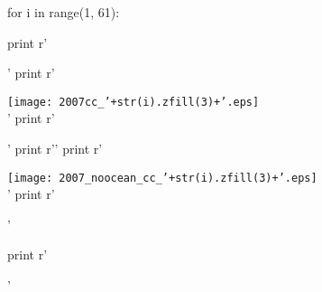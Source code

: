 \documentclass   {article}
\begin{document}
	
	\begin{python}
	for i in range(1, 61):
	
	    print r'\begin{center}'
	    print r'\parbox{0.40\linewidth}{\texttt{[image: 2007cc\_'+str(i).zfill(3)+'.eps]}\\'
	    print r' \centering  }'
	    print r'\hspace{0.1\linewidth}'
	    print r'\parbox{0.40\linewidth}{\texttt{[image: 2007\_noocean\_cc\_'+str(i).zfill(3)+'.eps]}\\'
	    print r'\centering }'
	
	    print r'\end{center}'
	
	
	
	\end{python}
	
	
\end{document}

